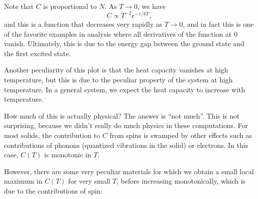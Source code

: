 \documentclass[a4paper]{article}
\begin{document}
\begin{eg}
  Note that $C$ is proportional to $N$. As $T \to 0$, we have
  \[
    C \propto T^{-2} e^{-\varepsilon/kT},
  \]
  and this is a function that decreases very rapidly as $T \to 0$, and in fact this is one of the favorite examples in analysis where all derivatives of the function at $0$ vanish. Ultimately, this is due to the energy gap between the ground state and the first excited state.

  Another peculiarity of this plot is that the heat capacity vanishes at high temperature, but this is due to the peculiar property of the system at high temperature. In a general system, we expect the heat capacity to increase with temperature.

  How much of this is actually physical? The answer is ``not much''. This is not surprising, because we didn't really do much physics in these computations. For most solids, the contribution to $C$ from spins is swamped by other effects such as contributions of phonons (quantized vibrations in the solid) or electrons. In this case, $C(T)$ is monotonic in $T$.

  However, there are some very peculiar materials for which we obtain a small local maximum in $C(T)$ for very small $T$, before increasing monotonically, which is due to the contributions of spin:
  \begin{center}
\end{center}
\end{eg}
\end{document}
